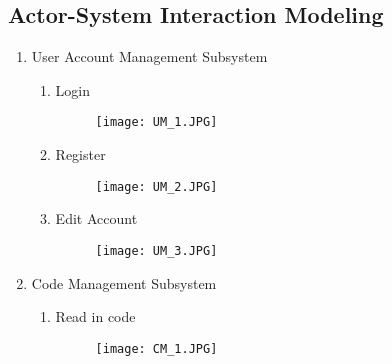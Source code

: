 \documentclass{article}
\begin{document}
	\subsection{Actor-System Interaction Modeling}
    	\begin{enumerate}
         \item{User Account Management Subsystem}
        		\begin{enumerate}
                    \item{Login}
                    \begin{figure}[H]
                    	\centering
                        \texttt{[image: UM\_1.JPG]}	
                        \newline
                        \newline
                    \end{figure}
                    
                    \item{Register}
                    \begin{figure}[H]
                    	\centering
                        \texttt{[image: UM\_2.JPG]}
                        \newline
                        \newline
                    \end{figure}
                    
                    \item{Edit Account}
                    \begin{figure}[H]
                    	\centering
                        \texttt{[image: UM\_3.JPG]}
                        \newline
                        \newline
                    \end{figure}
                 \end{enumerate}
                 
            \item{Code Management Subsystem}
        		\begin{enumerate}
                    \item{Read in code}
                    \begin{figure}[H]
                    	\centering
                        \texttt{[image: CM\_1.JPG]}	
                        \newline
                        \newline
                    \end{figure}
                    

\end{enumerate}
\end{enumerate}
\end{document}
